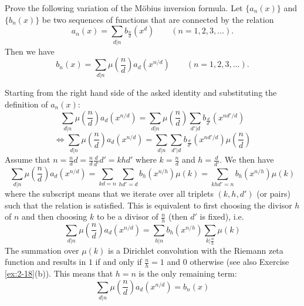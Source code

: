 \begin{exercise}
    \label{ex:2-28}
    Prove the following variation of the M{\"o}bius inversion formula. Let $\{a_n(x)\}$ and $\{b_n(x)\}$ be two sequences of functions that are connected by the relation
    \[
        a_n(x)= \sum_{d \vert n} b_{\frac{n}{d}}(x^d) \qquad (n=1,2,3,\dots).  
    \]
    Then we have
    \[
        b_n(x) = \sum_{d\vert n} \mu\left(\frac{n}{d}\right) a_d(x^{n/d}) \qquad (n=1,2,3,\ldots).  
    \]
\end{exercise}
\begin{solution}
    Starting from the right hand side of the asked identity and substituting the definition of $a_n(x)$:
    \[
        \sum_{d\vert n}  \mu\left(\frac{n}{d}\right) a_d(x^{n/d}) =  \sum_{d\vert n}  \mu\left(\frac{n}{d}\right) \sum_{d' \vert d} b_{\frac{d}{d'}}(x^{nd'/d}) 
    \]
    \[
       \Longleftrightarrow \sum_{d\vert n}  \mu\left(\frac{n}{d}\right) a_d(x^{n/d}) =  \sum_{d\vert n} \sum_{d' \vert d} b_{\frac{d}{d'}}(x^{nd'/d}) \mu\left(\frac{n}{d}\right) 
    \]
    Assume that $n=\frac{n}{d}d = \frac{n}{d}\frac{d}{d'}d' = khd'$ where $k=\frac{n}{d}$ and $h=\frac{d}{d'}$. We then have
    \[
        \sum_{d\vert n}  \mu\left(\frac{n}{d}\right) a_d(x^{n/d}) =  \sum_{kd=n} \sum_{hd'=d} b_{h}(x^{n/h}) \mu\left(k\right) = \sum_{khd' = n}b_{h}(x^{n/h}) \mu\left(k\right)
    \]
    where the subscript means that we iterate over all triplets $(k,h,d')$ (or pairs) such that the relation is satisfied. This is equivalent to first choosing the divisor $h$ of $n$ and then choosing $k$ to be a divisor of $\frac{n}{h}$ (then $d'$ is fixed), i.e.\
    \[
        \sum_{d\vert n}  \mu\left(\frac{n}{d}\right) a_d(x^{n/d}) = \sum_{h\vert n}b_h(x^{n/h}) \sum_{k \vert \frac{n}{h}} \mu(k)
    \]
    The summation over $\mu(k)$ is a Dirichlet convolution with the Riemann zeta function and results in $1$ if and only if $\frac{n}{h} = 1$ and $0$ otherwise (see also Exercise \ref{ex:2-18}(b)). This means that $h = n$ is the only remaining term:
    \[
        \sum_{d\vert n}  \mu\left(\frac{n}{d}\right) a_d(x^{n/d}) = b_n(x)
    \]
\end{solution}

